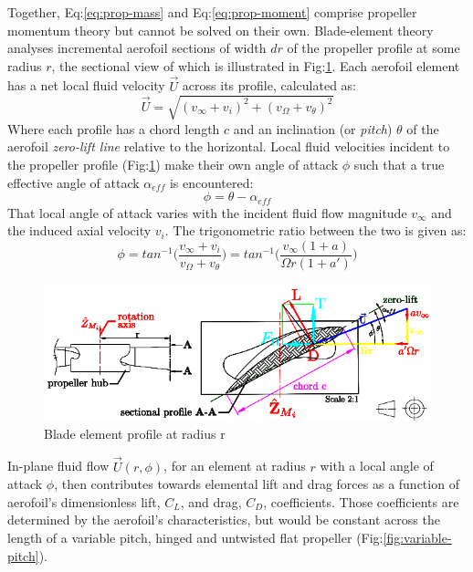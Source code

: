 Together, Eq:\ref{eq:prop-mass} and Eq:\ref{eq:prop-moment} comprise propeller momentum theory but cannot be solved on their own. Blade-element theory analyses incremental aerofoil sections of width $dr$ of the propeller profile  at some radius $r$, the sectional view of which is illustrated in Fig:\ref{fig:bem-profile}. Each aerofoil element has a net local fluid velocity $\vec{U}$ across its profile, calculated as:
\begin{equation}
\vec{U}=\sqrt{(v_\infty+v_i)^2+(v_\Omega+v_\theta)^2}
\end{equation}
Where each profile has a chord length $c$ and an inclination (or \emph{pitch}) $\theta$ of the aerofoil \emph{zero-lift line} relative to the horizontal. Local fluid velocities incident to the propeller profile (Fig:\ref{fig:bem-profile}) make their own angle of attack $\phi$ such that a true effective angle of attack $\alpha_{eff}$ is encountered:
\begin{equation}
\phi=\theta-\alpha_{eff}
\end{equation}
That local angle of attack varies with the incident fluid flow magnitude $v_\infty$ and the induced axial velocity $v_i$. The trigonometric ratio between the two is given as:
\begin{equation}
\phi=tan^{-1}\bigg(\frac{v_\infty+v_i}{v_\Omega+v_\theta}\bigg)=tan^{-1}\bigg(\frac{v_\infty(1+a)}{\Omega r(1+a')}\bigg)
\end{equation}
\par
\begin{figure}[hbtp]
\vspace{-15pt}
\centering
\includegraphics[width=\textwidth]{figs/bem-profile}
\caption{Blade element profile at radius r}
\label{fig:bem-profile}
\end{figure}
In-plane fluid flow $\vec{U}(r,\phi)$, for an element at radius $r$ with a local angle of attack $\phi$, then contributes towards elemental lift and drag forces as a function of aerofoil's dimensionless lift, $C_L$, and drag, $C_D$, coefficients. Those coefficients are determined by the aerofoil's characteristics, but would be constant across the length of a variable pitch, hinged and untwisted flat propeller (Fig:\ref{fig:variable-pitch}).

